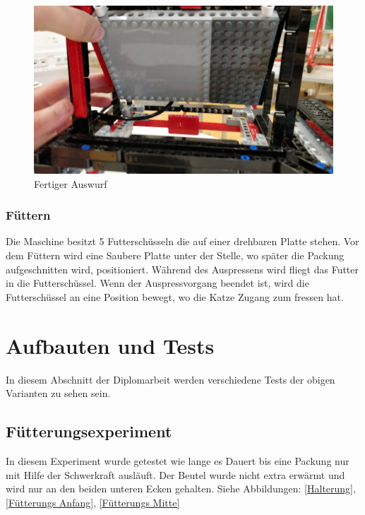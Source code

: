 \begin{figure}[H]
\begin{center}
\includegraphics[width=13cm]{Bilder/Ablauf_1_png/Auswurf_5}
\caption{Fertiger Auswurf}
\label{Fertiger Auswurf}
\end{center}
\end{figure}

\subsubsection{Füttern}

Die Maschine besitzt 5 Futterschüsseln die auf einer drehbaren Platte stehen. Vor dem Füttern wird eine Saubere Platte unter der Stelle, wo später die Packung aufgeschnitten wird, positioniert. Während des Auspressens wird fliegt das Futter in die Futterschüssel. Wenn der Auspressvorgang beendet ist, wird die Futterschüssel an eine Position bewegt, wo die Katze Zugang zum fressen hat.
\newpage


\section{Aufbauten und Tests}

In diesem Abschnitt der Diplomarbeit werden verschiedene Tests der obigen Varianten zu sehen sein. \\

\subsection{Fütterungsexperiment} 

In diesem Experiment wurde getestet wie lange es Dauert bis eine Packung nur mit Hilfe der Schwerkraft ausläuft. Der Beutel wurde nicht extra erwärmt und wird nur an den beiden unteren Ecken gehalten. Siehe Abbildungen: \ref{Halterung}, \ref{Fütterungs Anfang}, \ref{Fütterungs Mitte}

